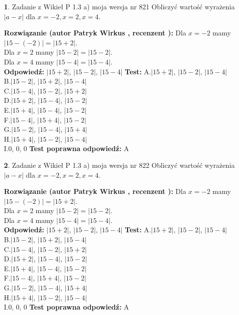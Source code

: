 \documentclass[12pt, a4paper]{article}
\theoremstyle{definition} %
\newtheorem{zad}{}
\newcommand{\zadStart}[1]{\begin{zad}#1\newline}
\newcommand{\zadStop}{\end{zad}}
\newcommand{\rozwStart}[2]{\noindent \textbf{Rozwiązanie (autor #1 , recenzent #2): }\newline}
\newcommand{\rozwStop}{\newline}
\newcommand{\odpStart}{\noindent \textbf{Odpowiedź:}\newline}
\newcommand{\odpStop}{\newline}
\newcommand{\testStart}{\noindent \textbf{Test:}\newline}
\newcommand{\testStop}{\newline}
\newcommand{\kluczStart}{\noindent \textbf{Test poprawna odpowiedź:}\newline}
\newcommand{\kluczStop}{\newline}
\begin{document}
\zadStart{Zadanie z Wikieł P 1.3 a) moja wersja nr 821}
Obliczyć wartość wyrażenia $|a - x|$ dla $x=-2,x=2,x=4$.
\zadStop
\rozwStart{Patryk Wirkus}{}
Dla $x = -2$ mamy $|15 - (-2)| = |15 + 2|$.\\
Dla $x = 2$ mamy $|15 - 2| = |15 - 2|$.\\
Dla $x = 4$ mamy $|15 - 4| = |15 - 4|$.\\
\rozwStop
\odpStart
$|15 + 2|$, $|15 - 2|$, $|15 - 4|$
\odpStop
\testStart
A.$|15 + 2|$, $|15 - 2|$, $|15 - 4|$\\
B.$|15 - 2|$, $|15 + 2|$, $|15 - 4|$\\
C.$|15 - 4|$, $|15 - 2|$, $|15 + 2|$\\
D.$|15 + 2|$, $|15 - 4|$, $|15 - 2|$\\
E.$|15 + 4|$, $|15 - 4|$, $|15 - 2|$\\
F.$|15 - 4|$, $|15 + 4|$, $|15 - 2|$\\
G.$|15 - 2|$, $|15 - 4|$, $|15 + 4|$\\
H.$|15 + 4|$, $|15 - 2|$, $|15 - 4|$\\
I.$0$, $0$, $0$
\testStop
\kluczStart
A
\kluczStop



\zadStart{Zadanie z Wikieł P 1.3 a) moja wersja nr 822}
Obliczyć wartość wyrażenia $|a - x|$ dla $x=-2,x=2,x=4$.
\zadStop
\rozwStart{Patryk Wirkus}{}
Dla $x = -2$ mamy $|15 - (-2)| = |15 + 2|$.\\
Dla $x = 2$ mamy $|15 - 2| = |15 - 2|$.\\
Dla $x = 4$ mamy $|15 - 4| = |15 - 4|$.\\
\rozwStop
\odpStart
$|15 + 2|$, $|15 - 2|$, $|15 - 4|$
\odpStop
\testStart
A.$|15 + 2|$, $|15 - 2|$, $|15 - 4|$\\
B.$|15 - 2|$, $|15 + 2|$, $|15 - 4|$\\
C.$|15 - 4|$, $|15 - 2|$, $|15 + 2|$\\
D.$|15 + 2|$, $|15 - 4|$, $|15 - 2|$\\
E.$|15 + 4|$, $|15 - 4|$, $|15 - 2|$\\
F.$|15 - 4|$, $|15 + 4|$, $|15 - 2|$\\
G.$|15 - 2|$, $|15 - 4|$, $|15 + 4|$\\
H.$|15 + 4|$, $|15 - 2|$, $|15 - 4|$\\
I.$0$, $0$, $0$
\testStop
\kluczStart
A
\kluczStop
\end{document}
